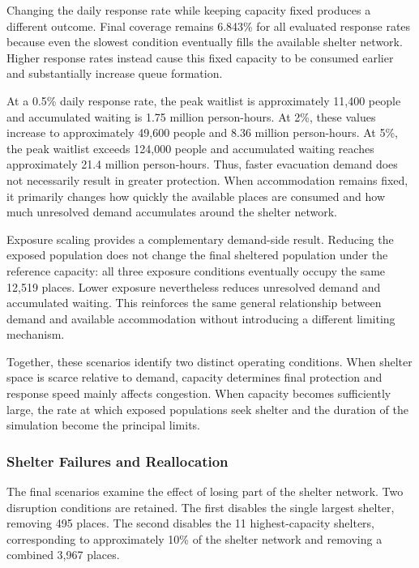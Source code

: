 Changing the daily response rate while keeping capacity fixed produces a different outcome. Final coverage remains 6.843\% for all evaluated response rates because even the slowest condition eventually fills the available shelter network. Higher response rates instead cause this fixed capacity to be consumed earlier and substantially increase queue formation.

At a 0.5\% daily response rate, the peak waitlist is approximately 11,400 people and accumulated waiting is 1.75 million person-hours. At 2\%, these values increase to approximately 49,600 people and 8.36 million person-hours. At 5\%, the peak waitlist exceeds 124,000 people and accumulated waiting reaches approximately 21.4 million person-hours.
Thus, faster evacuation demand does not necessarily result in greater protection. When accommodation remains fixed, it primarily changes how quickly the available places are consumed and how much unresolved demand accumulates around the shelter network.

Exposure scaling provides a complementary demand-side result. Reducing the exposed population does not change the final sheltered population under the reference capacity: all three exposure conditions eventually occupy the same 12,519 places. Lower exposure nevertheless reduces unresolved demand and accumulated waiting. This reinforces the same general relationship between demand and available accommodation without introducing a different limiting mechanism.

Together, these scenarios identify two distinct operating conditions. When shelter space is scarce relative to demand, capacity determines final protection and response speed mainly affects congestion. When capacity becomes sufficiently large, the rate at which exposed populations seek shelter and the duration of the simulation become the principal limits.


\subsubsection{Shelter Failures and Reallocation}
\label{sec:shelter_failures}

The final scenarios examine the effect of losing part of the shelter network. Two disruption conditions are retained. The first disables the single largest shelter, removing 495 places. The second disables the 11 highest-capacity shelters, corresponding to approximately 10\% of the shelter network and removing a combined 3,967 places.

